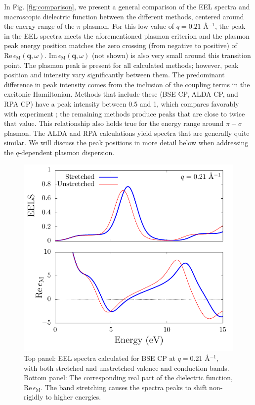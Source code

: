 \documentclass[aps,prb,10pt,showpacs,superscriptaddress,twocolumn,notitlepage]{revtex4-1}
\begin{document}
In Fig. \ref{fig:comparison}, we present a general comparison of the EEL spectra
and macroscopic dielectric function between the different methods, centered
around the energy range of the $\pi$ plasmon. For this low value of $q = 0.21$
\r{A}$^{-1}$, the peak in the EEL spectra meets the aforementioned plasmon
criterion and the plasmon peak energy position matches the zero crossing (from
negative to positive) of $\mathrm{Re}\,\epsilon_{\mathrm{M}}(\mathbf{q},
\omega)$. $\mathrm{Im}\,\epsilon_{\mathrm{M}}(\mathbf{q}, \omega)$ (not shown)
is also very small around this transition point. The plasmon peak is present for
all calculated methods; however, peak position and intensity vary significantly
between them. The predominant difference in peak intensity comes from the
inclusion of the coupling terms in the excitonic Hamiltonian. Methods that
include these (BSE CP, ALDA CP, and RPA CP) have a peak intensity between 0.5
and 1, which compares favorably with experiment \cite{zeppenfeldZP71,
buchnerPSSB77, marinopoulosPRB04}; the remaining methods produce peaks that are
close to twice that value. This relationship also holds true for the energy
range around $\pi + \sigma$ plasmon. The ALDA and RPA calculations yield spectra
that are generally quite similar. We will discuss the peak positions in more
detail below when addressing the $q$-dependent plasmon dispersion.

\begin{figure}[t]
\includegraphics[width=\linewidth]{fig03}
\caption{Top panel: EEL spectra calculated for BSE CP at $q = 0.21$
\r{A}$^{-1}$, with both stretched and unstretched valence and conduction bands.
Bottom panel: The corresponding real part of the dielectric function,
$\mathrm{Re}\,\epsilon_{\mathrm{M}}$. The band stretching causes the spectra
peaks to shift non-rigidly to higher energies.}
\label{fig:stretching}
\end{figure}
\end{document}
